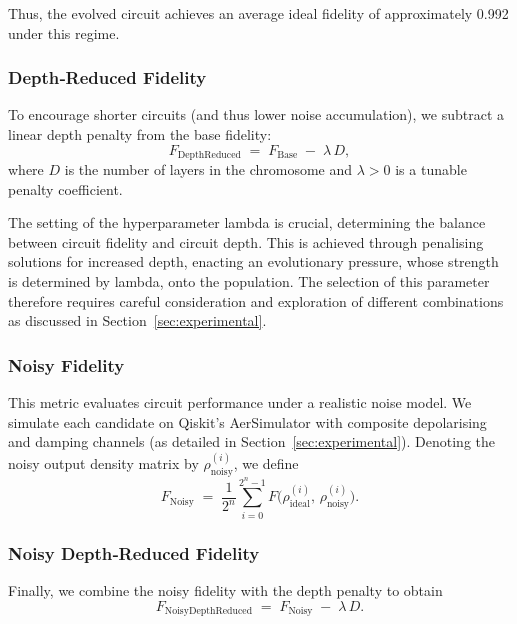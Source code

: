 \documentclass[11pt,a4paper]{article}
\begin{document}
Thus, the evolved circuit achieves an average ideal fidelity of approximately 0.992 under this regime.




\subsubsection*{Depth‐Reduced Fidelity}
To encourage shorter circuits (and thus lower noise accumulation), we subtract a linear depth penalty from the base fidelity:
\begin{equation}
  F_{\mathrm{DepthReduced}}
  \;=\;F_{\mathrm{Base}}\;-\;\lambda\,D,
\end{equation}
where $D$ is the number of layers in the chromosome and $\lambda>0$ is a tunable penalty coefficient.\newline

The setting of the hyperparameter lambda is crucial, determining the balance between circuit fidelity and circuit depth. This is achieved through penalising solutions for increased depth, enacting an evolutionary pressure, whose strength is determined by lambda, onto the population. The selection of this parameter therefore requires careful consideration and exploration of different combinations as discussed in Section~\ref{sec:experimental}.

\subsubsection*{Noisy Fidelity}
This metric evaluates circuit performance under a realistic noise model.  We simulate each candidate on Qiskit’s AerSimulator with composite depolarising and damping channels (as detailed in Section~\ref{sec:experimental}).  Denoting the noisy output density matrix by $\rho_{\mathrm{noisy}}^{(i)}$, we define
\begin{equation}
  F_{\mathrm{Noisy}}
  \;=\;\frac{1}{2^n}\sum_{i=0}^{2^n-1}
    F\bigl(\rho_{\mathrm{ideal}}^{(i)},\,\rho_{\mathrm{noisy}}^{(i)}\bigr).
\end{equation}

\subsubsection*{Noisy Depth‐Reduced Fidelity}

Finally, we combine the noisy fidelity with the depth penalty to obtain
\begin{equation}
  F_{\mathrm{NoisyDepthReduced}}
  \;=\;F_{\mathrm{Noisy}}\;-\;\lambda\,D.
\end{equation}
\end{document}
